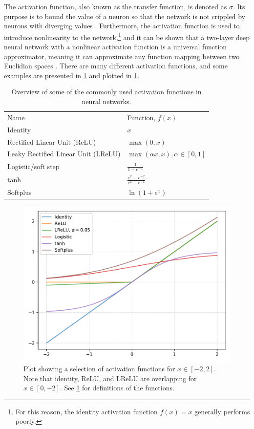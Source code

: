 The activation function, also known as the transfer function, is denoted as $\sigma$. Its purpose is to bound the value of a neuron so that the network is not crippled by neurons with diverging values \cite[81]{Wang2003}. Furthermore, the activation function is used to introduce nonlinearity to the network,\footnote{For this reason, the identity activation function $f(x)=x$ generally performs poorly.} and it can be shown that a two-layer deep neural network with a nonlinear activation function is a universal function approximator, meaning it can approximate any function mapping between two Euclidian spaces \cite{Cybenko1989}. There are many different activation functions, and some examples are presented in \cref{tab:activationfunctions} and plotted in \cref{fig:activationfunctions}.

\begin{table}[htbp]
    \centering
    \caption[Activation functions for neural networks]{Overview of some of the commonly used activation functions in neural networks. }
    \label{tab:activationfunctions}
    \begin{tabular}{ll}
    \hline
    Name & Function, $f(x)$ \\
    \hhline{==}
    Identity & $x$ \\
    Rectified Linear Unit (ReLU) & $\max\left(0, x\right)$ \\
    Leaky Rectified Linear Unit (LReLU) & $\max\left(\alpha x, x\right), \alpha\in[0,1]$ \\
    Logistic/soft step & $\frac{1}{1+e^{-x}}$  \\
    tanh & $\frac{e^x - e^{-x}}{e^x + e^{-x}}$ \\
    Softplus & $\ln\left(1+e^x\right)$ \\
    \hline
    \end{tabular}
\end{table}

\begin{figure}[htbp]  
    \centering
    \includegraphics[width=.8\textwidth]{figures/activationfunctions.pdf}
    \caption[Activation functions for neural networks]{Plot showing a selection of activation functions for $x\in[-2,2]$. Note that identity, ReLU, and LReLU are overlapping for $x\in[0,-2]$. See \cref{tab:activationfunctions} for definitions of the functions. }
    \label{fig:activationfunctions}
\end{figure}

